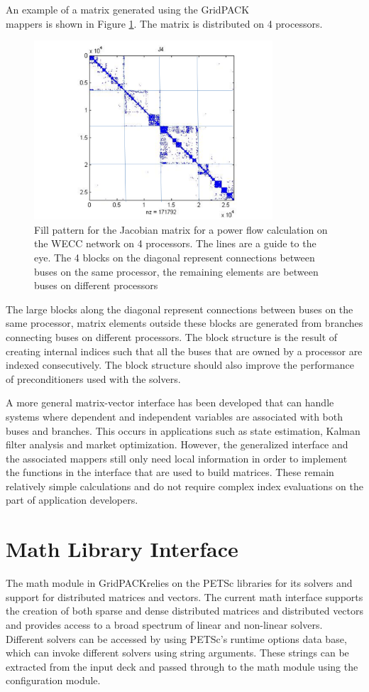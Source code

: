 \documentclass[preprint]{acm_proc_article-sp}
\begin{document}
An example of a matrix generated using the GridPACK\texttrademark\\
mappers is
shown in Figure \ref{matrix}. The matrix is distributed on 4 processors.
\begin{figure}
\centering
\includegraphics[width=3.5in,keepaspectratio=true]{./Fig5}
\caption{\label{matrix} Fill pattern for the Jacobian matrix for a power flow
calculation on the WECC network on 4 processors. The lines are a guide to the
eye. The 4 blocks on the diagonal
represent connections between buses on the same processor, the remaining elements
are between buses on different processors}
\end{figure}
The large blocks along the diagonal represent connections between buses on
the same processor, matrix elements outside these blocks are generated from
branches connecting buses on different processors. The block structure is the
result of creating internal indices such that all the buses that are owned by
a processor are indexed consecutively. The block structure should also improve
the performance of preconditioners used with the solvers.

A more general matrix-vector interface has been developed that can handle systems
where
dependent and independent variables are associated with both buses and branches.
This occurs in applications such as state estimation\cite{SE}, Kalman filter
analysis and
market optimization. However, the generalized interface and the associated
mappers still only need local information in order to implement the functions in
the interface that are used to build matrices. These remain relatively simple
calculations and do not require complex index evaluations on the part of
application developers.

\section{Math Library Interface}
The math module in
GridPACK\texttrademark relies on the PETSc libraries for its solvers and support
for distributed matrices and vectors.
The current math interface supports the creation of both sparse and dense
distributed matrices and distributed vectors and provides access to a broad
spectrum of linear and non-linear solvers. Different solvers can be accessed by
using PETSc's runtime options data base, which can invoke different solvers using
string arguments. These strings can be extracted from the input deck and passed
through to the math module using the configuration module.
\end{document}
